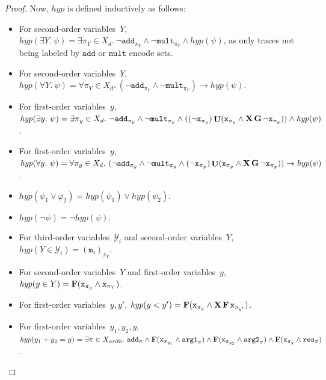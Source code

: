 \documentclass[dvipsnames,10pt,a4paper]{amsart}
\theoremstyle{definition}
\theoremstyle{remark}
\renewcommand{\phi}{\varphi}
\newcommand{\F}{\mathop{\mathbf{F}\vphantom{a}}\nolimits}
\newcommand{\G}{\mathop{\mathbf{G}\vphantom{a}}\nolimits}
\DeclareMathOperator{\U}{\mathbf{U}}
\newcommand{\X}{\mathop{\mathbf{X}\vphantom{a}}\nolimits}
\newcommand{\unidisvar}{X_d}
\newcommand{\inprop}{\mathtt{x}}
\newcommand{\argone}{\texttt{arg1}}
\newcommand{\argtwo}{\texttt{arg2}}
\newcommand{\res}{\texttt{res}}
\newcommand{\add}{\texttt{add}}
\newcommand{\mult}{\texttt{mult}}
\newcommand{\hyperize}{{\mathit{hyp}}}
\newcommand{\arith}{\mathit{arith}}
\newcommand{\marker}{\texttt{m}}
\begin{document}
\begin{proof}
Now, $\hyperize$ is defined inductively as follows: 
\begin{itemize}
    \item For second-order variables~$Y$, $\hyperize(\exists Y.\ \psi) = \exists \pi_Y \in \unidisvar.\ \neg\add_{\pi_Y} \wedge \neg\mult_{\pi_Y} \wedge \hyperize(\psi)$, as only traces not being labeled by $\add$ or $\mult$ encode sets.

    \item For second-order variables~$Y$, $\hyperize(\forall Y.\ \psi) = \forall \pi_Y \in \unidisvar.\ (\neg\add_{\pi_Y} \wedge \neg\mult_{\pi_Y}) \rightarrow \hyperize(\psi)$.

    \item For first-order variables~$y$, $\hyperize(\exists y.\ \psi) = \exists \pi_y \in \unidisvar.\ \neg\add_{\pi_y} \wedge \neg\mult_{\pi_y} \wedge ((\neg \inprop_{\pi_y})\U(\inprop_{\pi_y} \wedge \X\G\neg \inprop_{\pi_y})) \wedge \hyperize(\psi)$.

    \item For first-order variables~$y$, $\hyperize(\forall y.\ \psi) = \forall \pi_y \in \unidisvar.\ (\neg\add_{\pi_y} \wedge \neg\mult_{\pi_y} \wedge (\neg \inprop_{\pi_y})\U(\inprop_{\pi_y} \wedge \X\G\neg \inprop_{\pi_y})) \rightarrow \hyperize(\psi)$.

    \item $\hyperize(\psi_1 \lor \phi_2) = \hyperize(\psi_1) \lor \hyperize(\psi_2)$.
    
    \item $\hyperize(\lnot \psi) = \lnot \hyperize(\psi) $.

    \item For third-order variables~$\mathcal{Y}_i$ and second-order variables~$Y$, $\hyperize(Y\in \mathcal{Y}_i) = (\marker_i)_{\pi_Y}$.
    
    \item For second-order variables~$Y$ and first-order variables~$y$, $\hyperize(y\in Y) = \F(\inprop_{\pi_y} \land \inprop_{\pi_Y})$.
    
    \item For first-order variables~$y,y'$, $\hyperize(y<y') = \F(\inprop_{\pi_y} \land \X\F\inprop_{\pi_{y'}})$.
    
    \item For first-order variables~$y_1,y_2,y$, $\hyperize(y_1+y_2=y) = \exists \pi \in X_\arith.\ \add_\pi \land \F(\inprop_{\pi_{y_1}}\land\argone_\pi) \land \F(\inprop_{\pi_{y_2}}\land\argtwo_\pi) \land \F(\inprop_{\pi_y}\land\res_\pi)$.
    

\end{itemize}
\end{proof}
\end{document}
